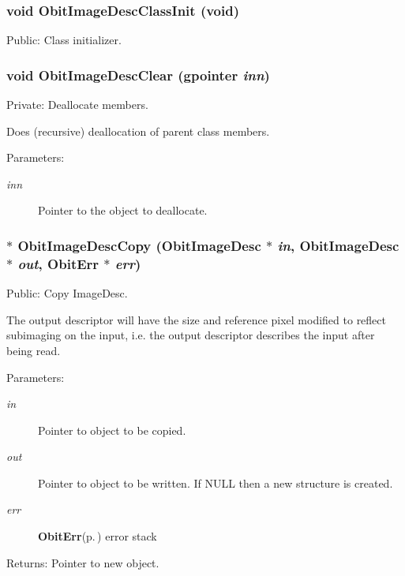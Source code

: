 \subsubsection{\setlength{\rightskip}{0pt plus 5cm}void Obit\-Image\-Desc\-Class\-Init (void)}\label{ObitImageDesc_8c_a20}


Public: Class initializer. 

\subsubsection{\setlength{\rightskip}{0pt plus 5cm}void Obit\-Image\-Desc\-Clear (gpointer {\em inn})}\label{ObitImageDesc_8c_a4}


Private: Deallocate members. 

Does (recursive) deallocation of parent class members. \begin{Desc}
\item[Parameters:]
\begin{description}
\item[{\em inn}]Pointer to the object to deallocate. \end{description}
\end{Desc}
\subsubsection{$\ast$ Obit\-Image\-Desc\-Copy ({\bf Obit\-Image\-Desc} $\ast$ {\em in}, {\bf Obit\-Image\-Desc} $\ast$ {\em out}, {\bf Obit\-Err} $\ast$ {\em err})}\label{ObitImageDesc_8c_a8}


Public: Copy Image\-Desc. 

The output descriptor will have the size and reference pixel modified to reflect subimaging on the input, i.e. the output descriptor describes the input after being read. \begin{Desc}
\item[Parameters:]
\begin{description}
\item[{\em in}]Pointer to object to be copied. \item[{\em out}]Pointer to object to be written. If NULL then a new structure is created. \item[{\em err}]{\bf Obit\-Err}{\rm (p.\,\pageref{structObitErr})} error stack \end{description}
\end{Desc}
\begin{Desc}
\item[Returns:]Pointer to new object. \end{Desc}
